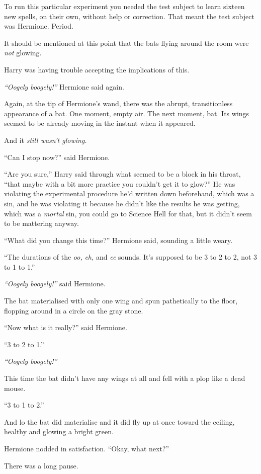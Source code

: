 To run this particular experiment you needed the test subject to learn
sixteen new spells, on their own, without help or correction. That meant
the test subject was Hermione. Period.

It should be mentioned at this point that the bats flying around the
room were \emph{not} glowing.

Harry was having trouble accepting the implications of this.

\emph{``Oogely boogely!''} Hermione said again.

Again, at the tip of Hermione's wand, there was the abrupt,
transitionless appearance of a bat. One moment, empty air. The next
moment, bat. Its wings seemed to be already moving in the instant when
it appeared.

And it \emph{still wasn't glowing.}

``Can I stop now?'' said Hermione.

``Are you sure,'' Harry said through what seemed to be a block in his
throat, ``that maybe with a bit more practice you couldn't get it to
glow?'' He was violating the experimental procedure he'd written down
beforehand, which was a sin, and he was violating it because he didn't
like the results he was getting, which was a \emph{mortal} sin, you
could go to Science Hell for that, but it didn't seem to be mattering
anyway.

``What did you change this time?'' Hermione said, sounding a little
weary.

``The durations of the \emph{oo,} \emph{eh,} and \emph{ee} sounds. It's
supposed to be 3 to 2 to 2, not 3 to 1 to 1.''

\emph{``Oogely boogely!''} said Hermione.

The bat materialised with only one wing and spun pathetically to the
floor, flopping around in a circle on the gray stone.

``Now what is it really?'' said Hermione.

``3 to 2 to 1.''

\emph{``Oogely boogely!''}

This time the bat didn't have any wings at all and fell with a plop like
a dead mouse.

``3 to 1 to 2.''

And lo the bat did materialise and it did fly up at once toward the
ceiling, healthy and glowing a bright green.

Hermione nodded in satisfaction. ``Okay, what next?''

There was a long pause.

